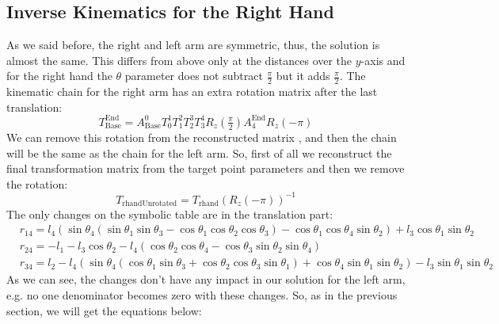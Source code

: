 \subsection{Inverse Kinematics for the Right Hand}
As we said before, the right and left arm are symmetric, thus, the solution is almost the same. This differs from above only at the distances over the $y$-axis and for the right hand the $\theta$ parameter does not subtract $\frac{\pi}{2}$ but it adds $\frac{\pi}{2}$. The kinematic chain for the right arm has an extra rotation matrix after the last translation:
\[
T^\text{End}_\text{Base} = A^0_\text{Base}T^1_0T^2_1T^3_2T^4_3R_z(\tfrac{\pi}{2})A^\text{End}_{4}R_z(-\pi)
\]
We can remove this rotation from the reconstructed matrix , and then the chain will be the same as the chain for the left arm. So, first of all we reconstruct the final transformation matrix from the target point parameters and then we remove the rotation:
\[
T_\text{rhandUnrotated} = T_\text{rhand}{\left(R_z(-\pi)\right)}^{-1}
\]
The only changes on the symbolic table are in the translation part:
\begin{align*}
&r_{14} = l_4\left(\sin\theta_4\left(\sin\theta_1\sin\theta_3 - \cos\theta_1\cos\theta_2\cos\theta_3\right) - \cos\theta_1\cos\theta_4\sin\theta_2\right) + l_3\cos\theta_1\sin\theta_2\\
&r_{24} = -l_1 - l_3\cos\theta_2 - l_4\left(\cos\theta_2\cos\theta_4 - \cos\theta_3\sin\theta_2\sin\theta_4\right)\\
&r_{34} = l_2 - l_4\left(\sin\theta_4\left(\cos\theta_1\sin\theta_3 + \cos\theta_2\cos\theta_3\sin\theta_1\right) + \cos\theta_4\sin\theta_1\sin\theta_2\right) - l_3\sin\theta_1\sin\theta_2
\end{align*}
As we can see, the changes don't have any impact in our solution for the left arm, e.g. no one denominator becomes zero with these changes. So, as in the previous section, we will get the equations below:
